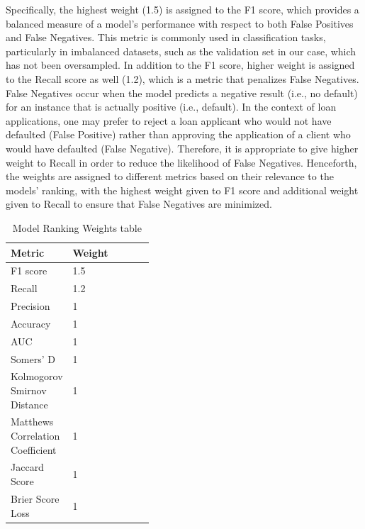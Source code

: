 Specifically, the highest weight (1.5) is assigned to the F1 score, which provides a balanced measure of a model's performance with respect to both False Positives and False Negatives.
This metric is commonly used in classification tasks, particularly in imbalanced datasets, such as the validation set in our case, which has not been oversampled.
In addition to the F1 score, higher weight is assigned to the Recall score as well (1.2), which is a metric that penalizes False Negatives.
False Negatives occur when the model predicts a negative result (i.e., no default) for an instance that is actually positive (i.e., default).
In the context of loan applications, one may prefer to reject a loan applicant who would not have defaulted (False Positive) rather than approving the application of a client who would have defaulted (False Negative). Therefore, it is appropriate to give higher weight to Recall in order to reduce the likelihood of False Negatives.
Henceforth, the weights are assigned to different metrics based on their relevance to the models' ranking, with the highest weight given to F1 score and additional weight given to Recall to ensure that False Negatives are minimized.

\begin{table}[H]
\small
\setlength{\tabcolsep}{8pt}
\renewcommand{\arraystretch}{1.3}
\centering
    \caption[Model Ranking Weights table]{Model Ranking Weights table}\label{tab:weightsrank}
    \begin{tabular}{>{\raggedleft\arraybackslash}p{0.4\linewidth} l}
\toprule
\textbf{Metric} & \textbf{Weight}\\
\midrule
\hline
F1 score & 1.5 \\
Recall & 1.2 \\
Precision & 1 \\
Accuracy & 1 \\
AUC & 1 \\
Somers' D & 1 \\ 
Kolmogorov Smirnov Distance  & 1 \\
Matthews Correlation Coefficient  & 1 \\
Jaccard Score  & 1 \\
Brier Score Loss  & 1 \\
\hline
\bottomrule
\end{tabular}
\vspace{0.7em}

\vspace{-1em}
\end{table}

